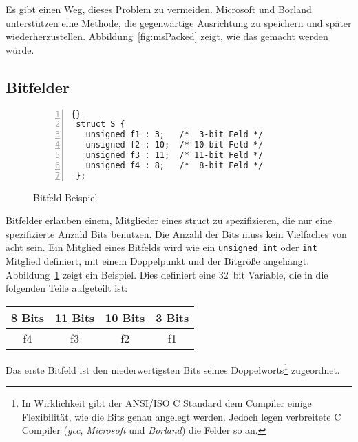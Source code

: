 Es gibt einen Weg, dieses Problem zu vermeiden. Microsoft
 und Borland 
unterst\"{u}tzen eine Methode, die gegenw\"{a}rtige Ausrichtung zu speichern
und sp\"{a}ter wiederherzustellen. Abbildung~\ref{fig:msPacked} zeigt,
wie das gemacht werden w\"{u}rde. 

\subsection{Bitfelder}

\begin{figure}[t]
\begin{lstlisting}[frame=tlrb, numbers=left]{}
 struct S {
   unsigned f1 : 3;   /*  3-bit Feld */
   unsigned f2 : 10;  /* 10-bit Feld */
   unsigned f3 : 11;  /* 11-bit Feld */
   unsigned f4 : 8;   /*  8-bit Feld */
 };
\end{lstlisting}
\caption{Bitfeld Beispiel \label{fig:bitStruct}}
\end{figure}

Bitfelder erlauben einem, Mitglieder eines {\code struct} zu
spezifizieren, die nur eine spezifizierte Anzahl Bits benutzen. Die
Anzahl der Bits muss kein Vielfaches von acht sein. Ein Mitglied
eines Bitfelds wird wie ein \lstinline|unsigned int| oder
\lstinline|int| Mitglied definiert, mit einem Doppelpunkt und der
Bitgr\"{o}{\ss}e angeh\"{a}ngt. Abbildung~\ref{fig:bitStruct} zeigt ein
Beispiel. Dies definiert eine 32~bit Variable, die in die folgenden
Teile aufgeteilt ist:
\begin{center}
\begin{tabular}{|c|c|c|c|}
 \multicolumn{1}{c}{8 Bits} & \multicolumn{1}{c}{11 Bits}
 & \multicolumn{1}{c}{10 Bits} & \multicolumn{1}{c}{3 Bits} \\
 \hline
 \hspace{2em} f4 \hspace{2em} & \hspace{3em} f3 \hspace{3em}
 & \hspace{3em} f2 \hspace{3em} & f1 \\
 \hline
\end{tabular}
\end{center}
Das erste Bitfeld ist den niederwertigsten Bits seines
Doppelworts\footnote{In Wirklichkeit gibt der ANSI/ISO C Standard
dem Compiler einige Flexibilit\"{a}t, wie die Bits genau angelegt
werden. Jedoch legen verbreitete C Compiler (\emph{gcc},
 \emph{Microsoft}  und
\emph{Borland})  die Felder so an.}
zugeordnet.

